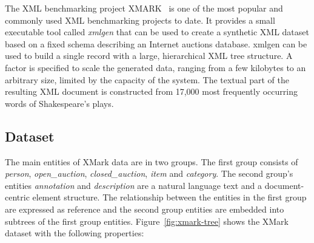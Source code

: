 The XML benchmarking project XMARK~\citep{xmark/original} is one of the most popular and commonly used XML benchmarking projects to date. It provides a small executable tool called \textit{xmlgen} that can be used to create a synthetic XML dataset based on a fixed schema describing an Internet auctions database. xmlgen can be used to build a single record with a large, hierarchical XML tree structure. A factor is specified to scale the generated data, ranging from a few kilobytes to an arbitrary size, limited by the capacity of the system. The textual part of the resulting XML document is constructed from 17,000 most frequently occurring words of Shakespeare's plays.

\subsection{Dataset}\label{xmark-dataset}
The main entities of XMark data are in two groups. The first group consists of  \textit{person}, \textit{open\_auction}, \textit{closed\_auction}, \textit{item} and \textit{category}. The second group's entities \textit{annotation} and \textit{description} are a natural language text and a document-centric element structure. The relationship between the entities in the first group are expressed as reference and the second group entities are embedded into subtrees of the first group entities. Figure~\ref{fig:xmark-tree} shows the XMark dataset with the following properties:
\label{xmark:desc:each}
